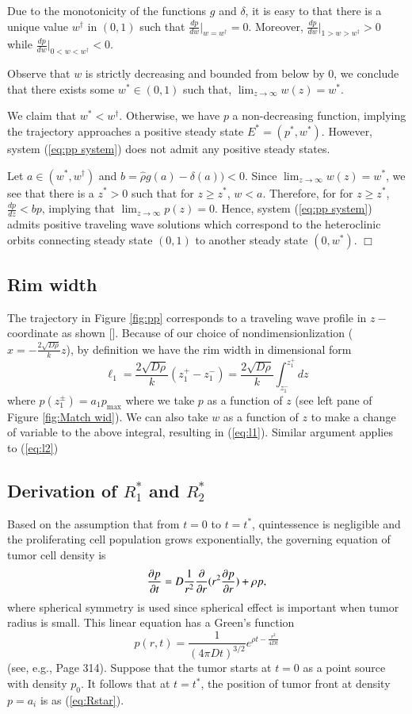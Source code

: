 \documentclass{aims}
\numberwithin{equation}{section}
\begin{document}
Due to the monotonicity of the functions $g$ and $\delta$, it is easy to that there is a unique value $w^{\dagger}$ in $(0, 1)$ such that 
$\frac{dp}{dw}\vert_{w=w^{\dagger}}=0.$ Moreover, $\frac{dp}{dw}\vert_{1>w>w^{\dagger}}>0$ while
$\frac{dp}{dw}\vert_{0<w<w^{\dagger}}<0.$

Observe that $w$ is strictly decreasing and bounded from below by 0, we conclude that there exists some $w^*\in(0,1)$ such that, $\lim_{z \rightarrow \infty} w(z)=w^*$. 

We claim that $w^*<w^{\dagger}.$ Otherwise, we have $p$ a non-decreasing function, implying the trajectory approaches a positive steady state $E^*=(p^*, w^*).$ However, system (\ref{eq:pp system}) does not admit any positive steady states. 

Let $a \in (w^*, w^{\dagger})$ and $b=\hat{\rho}g(a)-\delta(a)) <0.$ Since
$\lim_{z \rightarrow \infty}w(z)=w^*$, we see that there is a $z^*>0$ such that for $z \geq z^*$, $w<a$. Therefore, for for $z \geq z^*$, 
$\frac{dp}{dz}<bp$, implying that $\lim_{z \rightarrow \infty} p(z)=0.$
Hence, system (\ref{eq:pp system}) admits positive traveling wave solutions which correspond to the heteroclinic orbits connecting steady state $(0, 1)$ to another steady state $(0, w^*)$. $\Box$

\subsection*{Rim width}
The trajectory in Figure \ref{fig:pp} corresponds to a traveling wave profile in $z-$coordinate as shown []. Because of our choice of nondimensionlization ($x=-\frac{2 \sqrt{D\rho}}{k} z$), by definition we have the rim width in dimensional form  \[\ell_1= \frac{2 \sqrt{D\rho}}{k} (z_1^+ - z_1^-) = \frac{2 \sqrt{D\rho}}{k} \int_{z_1^-}^{z_1^+} dz\] where $p(z^{\pm}_1)=a_1 p_{\max}$ where we take $p$ as a function of $z$ (see left pane of Figure \ref{fig:Match wid}). We can also take $w$ as a function of $z$ to make a change of variable to the above integral, resulting in (\ref{eq:l1}). Similar argument applies to (\ref{eq:l2})
 
\subsection*{Derivation of $R_1^*$ and $R_2^*$}
Based on the assumption that from $t=0$ to $t=t^{*}$, quintessence is negligible and the proliferating cell population grows exponentially, the governing equation of tumor cell density is \[ \frac{\partial p}{\partial t} =  D\frac{1}{r^2} \frac{\partial}{\partial r} (r^2 \frac{\partial p}{\partial r}) + \rho p,\] where spherical symmetry is used since spherical effect is important when tumor radius is small. This linear equation has a Green's function \[p(r,t)=\frac{1}{(4 \pi D t)^{3/2}} e^{\rho t - \frac{r^2}{4Dt}}\] (see, e.g., \cite{KotBook} Page 314). Suppose that the tumor starts at $t=0$ as a point source with density $p_0$. It follows that at $t=t^*$, the position of tumor front at density $p=a_i$  is as (\ref{eq:Rstar}). 
\end{document}
